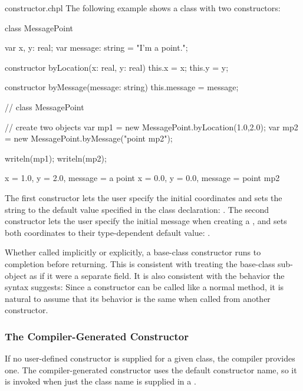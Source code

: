 \begin{chapelexample}{constructor.chpl}
The following example shows a class with two constructors:
\begin{chapel}
class MessagePoint {
  var x, y: real;
  var message: string = "I'm a point.";

  constructor byLocation(x: real, y: real) 
  { this.x = x; this.y = y; }

  constructor byMessage(message: string) 
  { this.message = message; }
}  // class MessagePoint

// create two objects
var mp1 = new MessagePoint.byLocation(1.0,2.0);
var mp2 = new MessagePoint.byMessage("point mp2");
\end{chapel}
\begin{chapelpost}
writeln(mp1);
writeln(mp2);
\end{chapelpost}
\begin{chapeloutput}
{x = 1.0, y = 2.0, message = a point}
{x = 0.0, y = 0.0, message = point mp2}
\end{chapeloutput}
The first constructor lets the user specify the initial coordinates
and sets the string to the default value specified in the class
declaration: .  The second constructor lets the user specify the initial message
when creating a , and sets both coordinates to their
type-dependent default value: .
\end{chapelexample}

Whether called implicitly or explicitly, a base-class constructor runs to
completion before returning.  This is consistent with treating the base-class
sub-object as if it were a separate field.  It is also consistent with the
behavior the syntax suggests: Since a constructor can be called like a normal
method, it is natural to assume that its behavior is the same when called from
another constructor.

\subsubsection{The Compiler-Generated Constructor}
\label{The_Compiler_Generated_Constructor}

If no user-defined constructor is supplied for a given class, the compiler
provides one.  The compiler-generated constructor uses the default constructor
name, so it is invoked when just the class name is supplied in
a .  

